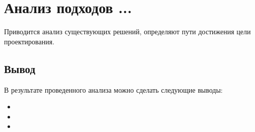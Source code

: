 \section{Анализ подходов ...}
\label{sec:analysis}

Приводится анализ существующих решений, определяют пути достижения цели проектирования.

\subsection{Вывод}
В результате проведенного анализа можно сделать следующие выводы:

\begin{itemize}
    \item 
    \item 
    \item 
\end{itemize}




